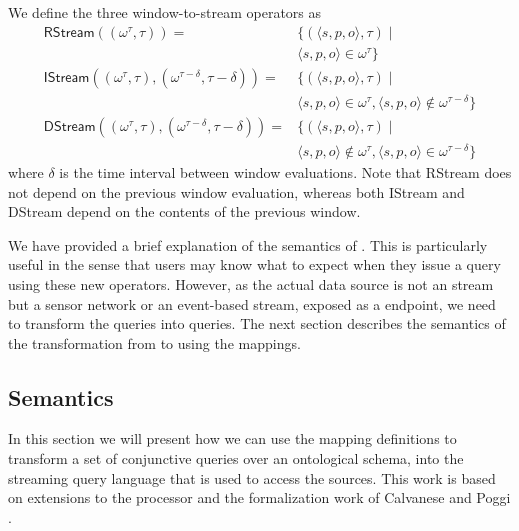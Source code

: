 We define the three window-to-stream operators as
\begin{align*}
  \textsf{RStream}(
		{\scriptstyle (\omega^\tau, \tau)}) 
		=& \{(\langle s, p, o \rangle, \tau) \mid \\
	 	 & \langle s, p, o \rangle \in \omega^\tau\}\\
%
  \textsf{IStream}(
		{\scriptstyle (\omega^\tau, \tau), (\omega^{\tau-\delta}, \tau - \delta)}) 
		=& \{(\langle s, p, o \rangle, \tau) \mid \\
		& \langle s, p, o \rangle \in \omega^\tau, \langle s, p, o \rangle \notin \omega^{\tau-\delta}\}\\
%
  \textsf{DStream}(
		{\scriptstyle (\omega^\tau, \tau), (\omega^{\tau-\delta}, \tau - \delta)})
		=& \{(\langle s, p, o \rangle, \tau) \mid \\
		& \langle s, p, o \rangle \notin \omega^\tau, \langle s, p, o \rangle \in \omega^{\tau-\delta}\}
\end{align*}
where $\delta$ is the time interval between window evaluations.
Note that \textsf{RStream} does not depend on the previous window evaluation, whereas both \textsf{IStream} and \textsf{DStream} depend on the contents of the previous window.

We have provided a brief explanation of the semantics of \sparqlstr. 
This is particularly useful in the sense that users may know what to expect when they issue a query using these new operators. 
However, as the actual data source is not an \rdf stream but a sensor network or an event-based stream, \eg exposed as a \sneeql endpoint, we need to transform the \sparqlstr queries into \sneeql queries.
The next section describes the semantics of the transformation from \sparqlstr to \sneeql using the \stwoo mappings.


\subsection{\bigstwoo Semantics}
\label{mappingsemantics}

In this section we will present how we can use the \stwoo mapping definitions to transform a set of conjunctive queries over an ontological schema, into the streaming query language \sneeql that is used to access the sources. 
This work is based on extensions to the \odemapster processor \cite{Barrasa_04} and the
formalization work of Calvanese \etal \cite{Calvanese_05} and Poggi \etal \cite{Poggi_08}.

